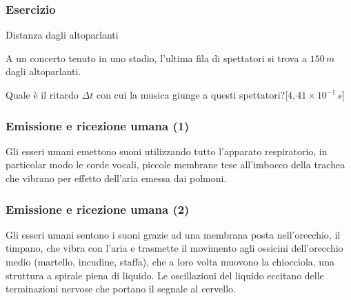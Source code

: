 \documentclass[]{beamer}
\theoremstyle{plain}
\begin{document}
\begin{frame}
\frametitle{Esercizio}
\begin{exampleblock}{Distanza dagli altoparlanti}
\small{A un concerto tenuto in uno stadio, l'ultima fila di spettatori si trova a $ 150 \, m $ dagli altoparlanti.

Quale è il ritardo $ \Delta t $ con cui la musica giunge a questi spettatori?\hspace*{\fill}[$ 4,41 \times 10^{-1} \, s $]}
\end{exampleblock}
\end{frame}




\begin{frame}
\frametitle{Emissione e ricezione umana (1)}
Gli esseri umani emettono suoni utilizzando tutto l'apparato respiratorio, in particolar modo le \alert{corde vocali}, piccole membrane tese all'imbocco della trachea che vibrano per effetto dell'aria emessa dai polmoni.
\end{frame}


\begin{frame}
\frametitle{Emissione e ricezione umana (2)}
Gli esseri umani sentono i suoni grazie ad una membrana posta nell'orecchio, il \alert{timpano}, che vibra con l'aria e trasmette il movimento agli ossicini dell'orecchio medio (martello, incudine, staffa), che a loro volta muovono la chiocciola, una struttura a spirale piena di liquido. Le oscillazioni del liquido eccitano delle terminazioni nervose che portano il segnale al cervello.
\end{frame}
\end{document}
